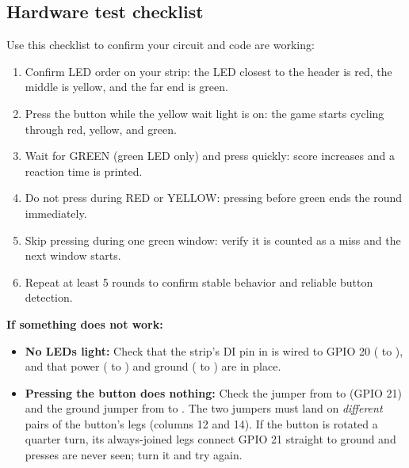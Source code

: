 \subsection{Hardware test checklist}
Use this checklist to confirm your circuit and code are working:
\begin{enumerate}
    \item Confirm LED order on your strip: the LED closest to the header is red, the middle is yellow, and the far end is green.
    \item Press the button while the yellow wait light is on: the game starts cycling through red, yellow, and green.
    \item Wait for GREEN (green LED only) and press quickly: score increases and a reaction time is printed.
    \item Do not press during RED or YELLOW: pressing before green ends the round immediately.
    \item Skip pressing during one green window: verify it is counted as a miss and the next window starts.
    \item Repeat at least 5 rounds to confirm stable behavior and reliable button detection.
\end{enumerate}

\begin{tcolorbox}[colback=yellow!10!white,colframe=yellow!50!black]
    \textbf{If something does not work:}
    \begin{itemize}
        \item \textbf{No LEDs light:} Check that the strip's DI pin in  is wired to
        GPIO 20 ( to ), and that power
        ( to ) and ground
        ( to ) are in place.
        \item \textbf{Pressing the button does nothing:} Check the jumper from 
        to  (GPIO 21) and the ground jumper from
         to . The two jumpers must land on
        \emph{different} pairs of the button's legs (columns 12 and 14). If the button is rotated a quarter
        turn, its always-joined legs connect GPIO 21 straight to ground and presses are never seen; turn it
        and try again.
    \end{itemize}
\end{tcolorbox}

